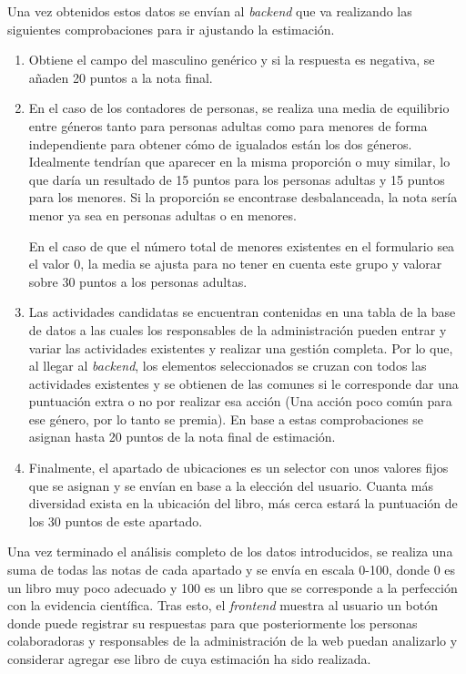 Una vez obtenidos estos datos se envían al \textit{backend} que va realizando las siguientes comprobaciones para ir ajustando la estimación.
\begin{enumerate}
    \item Obtiene el campo del masculino genérico y si la respuesta es negativa, se añaden 20 puntos a la nota final.
    \item En el caso de los contadores de personas, se realiza una media de equilibrio entre géneros tanto para personas adultas como para menores de forma independiente para obtener cómo de igualados están los dos géneros.  Idealmente tendrían que aparecer en la misma proporción o muy similar, lo que daría un resultado de 15 puntos para los personas adultas y 15 puntos para los menores. Si la proporción se encontrase desbalanceada, la nota sería menor ya sea en personas adultas o en menores.

En el caso de que el número total de menores existentes en el formulario sea el valor 0, la media se ajusta para no tener en cuenta este grupo y valorar sobre 30 puntos a los personas adultas.
\item Las actividades candidatas se encuentran contenidas en una tabla de la base de datos a las cuales los responsables de la administración pueden entrar y variar las actividades existentes y realizar una gestión completa. Por lo que, al llegar al \textit{backend}, los elementos seleccionados se cruzan con todos las actividades existentes y se obtienen de las comunes si le corresponde dar una puntuación extra o no por realizar esa acción (Una acción poco común para ese género, por lo tanto se premia). En base a estas comprobaciones se asignan hasta 20 puntos de la nota final de estimación.
\item Finalmente, el apartado de ubicaciones es un selector con unos valores fijos que se asignan y se envían en base a la elección del usuario. Cuanta más diversidad exista en la ubicación del libro, más cerca estará la puntuación de los 30 puntos de este apartado.

\end{enumerate}

Una vez terminado el análisis completo de los datos introducidos, se realiza una suma de todas las notas de cada apartado y se envía en escala 0-100, donde 0 es un libro muy poco adecuado y 100 es un libro que se corresponde a la perfección con la evidencia científica. Tras esto, el \textit{frontend} muestra al usuario un botón donde puede registrar su respuestas para que posteriormente los personas colaboradoras y responsables de la administración de la web puedan analizarlo y considerar agregar ese libro de cuya estimación ha sido realizada.




